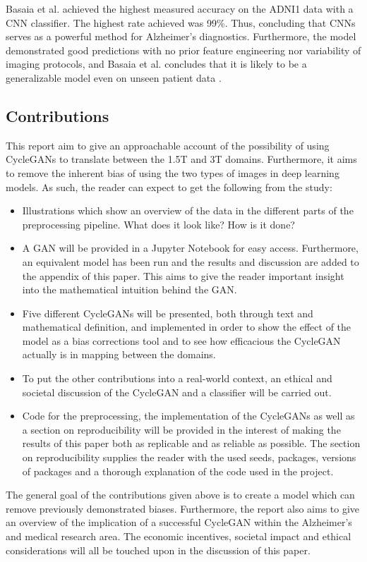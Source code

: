 \documentclass[11pt, fleqn, titlepage]{article}
\newcommand{\1}[1]{\mathds{1}\left[#1\right]}
\begin{document}
Basaia et al. achieved the highest measured accuracy on the ADNI1 data with a CNN classifier. The highest rate achieved was 99\%. Thus, concluding that CNNs serves as a powerful method for Alzheimer's diagnostics. Furthermore, the model demonstrated good predictions with no prior feature engineering nor variability of imaging protocols, and Basaia et al. concludes that it is likely to be a generalizable model even on unseen patient data \cite{neuro}. 

\subsection{Contributions}

This report aim to give an approachable account of the possibility of using CycleGANs to translate between the 1.5T and 3T domains. Furthermore, it aims to remove the inherent bias of using the two types of images in deep learning models. As such, the reader can expect to get the following from the study:

\begin{itemize}
	\item Illustrations which show an overview of the data in the different parts of the preprocessing pipeline. What does it look like? How is it done?
	
	\item A GAN will be provided in a Jupyter Notebook for easy access. Furthermore, an equivalent model has been run and the results and discussion are added to the appendix of this paper. This aims to give the reader important insight into the mathematical intuition behind the GAN.
	
	\item Five different CycleGANs will be presented, both through text and mathematical definition, and implemented in order to show the effect of the model as a bias corrections tool and to see how efficacious the CycleGAN actually is in mapping between the domains.
	
	\item To put the other contributions into a real-world context, an ethical and societal discussion of the CycleGAN and a classifier will be carried out. 
	
	\item Code for the preprocessing, the implementation of the CycleGANs as well as a section on reproducibility will be provided in the interest of making the results of this paper both as replicable and as reliable as possible. The section on reproducibility supplies the reader with the used seeds, packages, versions of packages and a thorough explanation of the code used in the project.
\end{itemize}
\noindent
The general goal of the contributions given above is to create a model which can remove previously demonstrated biases. Furthermore, the report also aims to give an overview of the implication of a successful CycleGAN within the Alzheimer's and medical research area. The economic incentives, societal impact and ethical considerations will all be touched upon in the discussion of this paper. 
\end{document}

